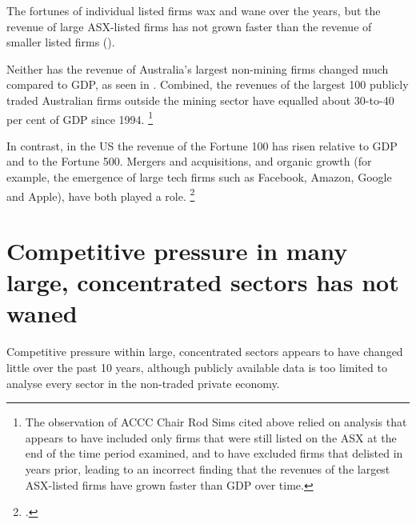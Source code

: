 The fortunes of individual listed firms wax and wane over the years, but the revenue of large ASX-listed firms has not grown faster than the revenue of smaller listed firms ().


Neither has the revenue of Australia's largest non-mining firms changed much compared to GDP, as seen in . Combined, the revenues of the largest 100 publicly traded Australian firms outside the mining sector have equalled about 30-to-40 per cent of GDP since 1994.%
    \footnote{The observation of ACCC Chair Rod Sims cited above \parencite{Sims-2016-Keynote-RBB-Concentration} relied on analysis that appears to have included only firms that were still listed on the ASX at the end of the time period examined, and to have excluded firms that delisted in years prior, leading to an incorrect finding that the revenues of the largest ASX-listed firms have grown faster than GDP over time.}



In contrast, in the US the revenue of the Fortune 100 has risen relative to GDP and to the Fortune 500. Mergers and acquisitions, and organic growth (for example, the emergence of large tech firms such as Facebook, Amazon, Google and Apple), have both played a role.%
    \footcite{Econsuperstar2016}


\section{Competitive pressure in many large, concentrated sectors has not waned}

Competitive pressure within large, concentrated sectors appears to have changed little over the past 10 years, although publicly available data is too limited to analyse every sector in the non-traded private economy.


